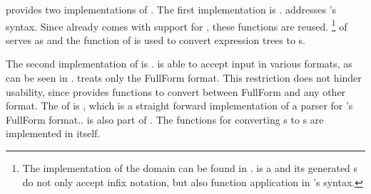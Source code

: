 \LibExtIO provides two implementations of \adthistype.
The first implementation is \adthistype. \adthistype addresses \Maple's syntax. Since \LibAlgebra already comes with support for \Maple, these functions are reused. \footnote{The implementation of the domain  can be found in \LibAlgebra.  is a  and its generated s do not only accept infix notation, but also function application in \Maple's syntax.} of \LibAlgebra serves as  and the  function of  is used to convert expression trees to s.

The second implementation of  is \adthistype. \Mathematica is able to accept input in various formats, as can be seen in \cite{MathematicaBook}. \adthistype treats only the FullForm format. This restriction does not hinder usability, since \Mathematica provides functions to convert between FullForm and any other format. The  of \adthistype is , which is a straight forward implementation of a parser for \Mathematica's FullForm format..  is also part of \LibExtIO. The functions for converting s to s are implemented in \adthistype itself.

